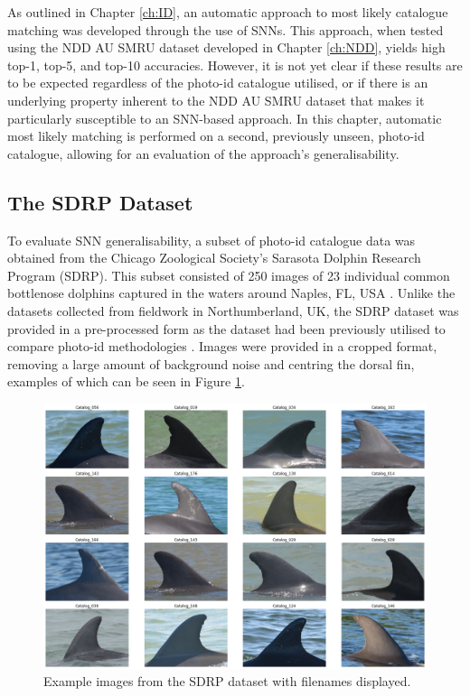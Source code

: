As outlined in Chapter \ref{ch:ID}, an automatic approach to most likely catalogue matching was developed through the use of SNNs. This approach, when tested using the NDD AU SMRU dataset developed in Chapter \ref{ch:NDD}, yields high top-1, top-5, and top-10 accuracies. However, it is not yet clear if these results are to be expected regardless of the photo-id catalogue utilised, or if there is an underlying property inherent to the NDD AU SMRU dataset that makes it particularly susceptible to an SNN-based approach. In this chapter, automatic most likely matching is performed on a second, previously unseen, photo-id catalogue, allowing for an evaluation of the approach's generalisability.

\subsection{The SDRP Dataset}\label{ch:SNNEvaluation,sec:SDRP,sub:SDRPDataset}

To evaluate SNN generalisability, a subset of photo-id catalogue data was obtained from the Chicago Zoological Society's Sarasota Dolphin Research Program (SDRP). This subset consisted of 250 images of 23 individual common bottlenose dolphins captured in the waters around Naples, FL, USA \cite{tyson_moore_final_2020}. Unlike the datasets collected from fieldwork in Northumberland, UK, the SDRP dataset was provided in a pre-processed form as the dataset had been previously utilised to compare photo-id methodologies \cite{tyson_moore_rise_2022}. Images were provided in a cropped format, removing a large amount of background noise and centring the dorsal fin, examples of which can be seen in Figure \ref{fig:sdrp-example}. 

\begin{figure}
	\begin{center}
		\includegraphics[scale=0.3]{Chapter6/figs/SDRP_egs_tiled.png}
	\end{center}
	\caption{Example images from the SDRP dataset with filenames displayed.}
	\label{fig:sdrp-example}
\end{figure}

